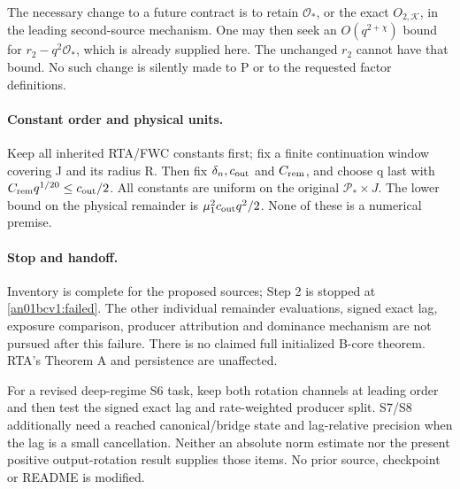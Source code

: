 \documentclass[11pt]{article}
\newcommand{\K}{\mathcal K}
\begin{document}
The necessary change to a future contract is to retain
\(\mathcal O_*\), or the exact \(O_{2,\K}\), in the leading
second-source mechanism. One may then seek an \(O(q^{2+\chi})\)
bound for \(r_2-q^2\mathcal O_*\), which is already supplied here.
The unchanged \(r_2\) cannot have that bound. No such change is
silently made to P or to the requested factor definitions.

\paragraph{Constant order and physical units.}
Keep all inherited RTA/FWC constants first; fix a finite continuation
window covering J and its radius R. Then fix \(\delta_n,c_{\rm out}\)
and \(C_{\rm rem}\), and choose q last with
\(C_{\rm rem}q^{1/20}\le c_{\rm out}/2\).
All constants are uniform on the original \(\mathcal P_*\times J\).
The lower bound on the physical remainder is
\(\mu_1^2c_{\rm out}q^2/2\). None of these is a numerical premise.

\paragraph{Stop and handoff.}
Inventory is complete for the proposed sources; Step 2 is stopped
at \eqref{an01bcv1:failed}. The other individual remainder
evaluations, signed exact lag, exposure comparison, producer
attribution and dominance mechanism are not pursued after this
failure. There is no claimed full initialized B-core theorem.
RTA's Theorem A and persistence are unaffected.

For a revised deep-regime S6 task, keep both rotation channels at
leading order and then test the signed exact lag and rate-weighted
producer split. S7/S8 additionally need a reached canonical/bridge
state and lag-relative precision when the lag is a small cancellation.
Neither an absolute norm estimate nor the present positive
output-rotation result supplies those items. No prior source,
checkpoint or README is modified.
\end{document}
